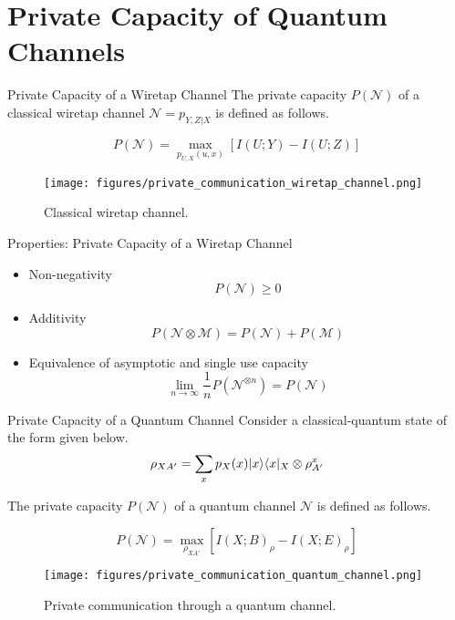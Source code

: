 \section{Private Capacity of Quantum Channels}

\begin{frame}{Private Capacity of a Wiretap Channel}
The private capacity $P(\mathcal{N})$ of a classical wiretap channel $\mathcal{N} = p_{Y,Z|X}$ is defined as follows.
\begin{tcolorbox}
$$P(\mathcal{N}) = \max_{p_{U,X}(u,x)} \left[ I(U;Y) - I(U;Z) \right]$$
\end{tcolorbox}

\begin{figure}
    \texttt{[image: figures/private\_communication\_wiretap\_channel.png]}
    \caption{Classical wiretap channel.}
\end{figure}
\end{frame}

\begin{frame}{Properties: Private Capacity of a Wiretap Channel}
\begin{itemize}
    \setlength{\itemsep}{1.5em}
    \item Non-negativity
    $$P(\mathcal{N}) \geq 0$$
    \item Additivity
    $$P(\mathcal{N} \otimes \mathcal{M}) = P(\mathcal{N}) + P(\mathcal{M})$$
    \item Equivalence of asymptotic and single use capacity
    $$\lim_{n \rightarrow \infty} \frac{1}{n} P(\mathcal{N}^{\otimes n}) = P(\mathcal{N})$$
\end{itemize}
\end{frame}

\begin{frame}{Private Capacity of a Quantum Channel}
Consider a classical-quantum state of the form given below.
$$\rho_{XA'} = \sum_{x} p_X(x) \lvert x\rangle\langle x\rvert_X \otimes \rho_{A'}^x $$

The private capacity $P(\mathcal{N})$ of a quantum channel $\mathcal{N}$ is defined as follows.
\begin{tcolorbox}
$$P(\mathcal{N}) = \max_{\rho_{XA'}} \left[ I(X;B)_\rho - I(X;E)_\rho \right]$$
\end{tcolorbox}

\begin{figure}
    \texttt{[image: figures/private\_communication\_quantum\_channel.png]}
    \caption{Private communication through a quantum channel.}
\end{figure}
\end{frame}

